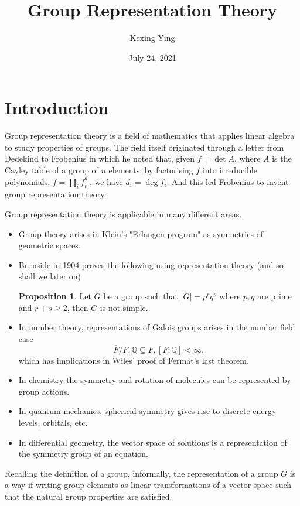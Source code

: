 \documentclass[]{article}
\title{Group Representation Theory}
\author{Kexing Ying}
\date{July 24, 2021}
\theoremstyle{definition}
\theoremstyle{definition}
\newtheorem{proposition}{Proposition}[section]
\begin{document}
\maketitle

{
\hypersetup{linkcolor=}
\setcounter{tocdepth}{2}
\tableofcontents
}
\newpage

\section{Introduction}

Group representation theory is a field of mathematics that applies linear algebra 
to study properties of groups. The field itself originated through a letter 
from Dedekind to Frobenius in which he noted that, given \(f = \det A\), where 
\(A\) is the Cayley table of a group of \(n\) elements, by factorising \(f\) 
into irreducible polynomials, \(f = \prod_i f_i^{d_i}\), we have \(d_i = \deg f_i\). 
And this led Frobenius to invent group representation theory.

Group representation theory is applicable in many different areas.
\begin{itemize}
  \item Group theory arises in Klein's "Erlangen program" as symmetries of 
    geometric spaces.
  \item Burnside in 1904 proves the following using representation theory 
    (and so shall we later on)
    \begin{proposition}
      Let \(G\) be a group such that \(|G| = p^r q^s\) where \(p, q\) are 
      prime and \(r + s \ge 2\), then \(G\) is not simple.
    \end{proposition}
  \item In number theory, representations of Galois groups arises in the 
    number field case 
    \[\overline{F} / F, \mathbb{Q} \subseteq F, [F : \mathbb{Q}] < \infty,\]
    which has implications in Wiles' proof of Fermat's last theorem.
  \item In chemistry the symmetry and rotation of molecules can be represented 
    by group actions.
  \item In quantum mechanics, spherical symmetry gives rise to discrete energy 
    levels, orbitals, etc.
  \item In differential geometry, the vector space of solutions is a representation 
    of the symmetry group of an equation.
\end{itemize}

Recalling the definition of a group, informally, the representation of a group \(G\) 
is a way if writing group elements as linear transformations of a vector space 
such that the natural group properties are satisfied. 
\end{document}
